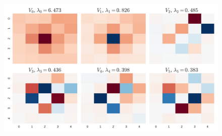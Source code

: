 \documentclass[landscape]{sciposter}
\newlength{\customfigwidth}
\begin{document}
\begin{multicols}{3}
\begin{figure}
    \center 
    \includegraphics[width=1.5\customfigwidth]{figures/avg_features.pdf}%
\end{figure}

\columnbreak
\end{multicols}



%
%



% 


%
%
 
\end{document}
